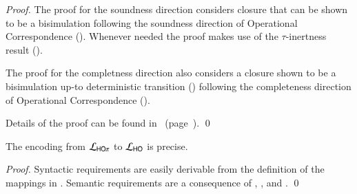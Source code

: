 \begin{proof}
	The proof for the soundness direction considers
	closure that can be shown to be a bisimulation
	following the soundness direction of Operational Correspondence
	(). Whenever needed
	the proof makes use of the $\tau$-inertness result
	().

	The proof for the completness direction also considers
	a closure shown to be a bisimulation
	up-to deterministic transition ()
	following the completeness direction of Operational Correspondence
	().

	Details of the proof can be found in~
	(page~\pageref{app:prop:fulla_HOp_to_HO}).
	\qed
\end{proof}

\begin{proposition}\myrm
	\label{prop:prec:HOp_to_HO}
	The encoding from $\mathcal{L}_{\mathsf{HO}\pi}$ to $\mathcal{L}_{\mathsf{HO}}$
	is precise.
\end{proposition}

\begin{proof}
	Syntactic requirements are easily derivable from the
	definition of the mappings in .
	Semantic requirements are a consequence of
	, , and .
	\qed
\end{proof}

%

%

